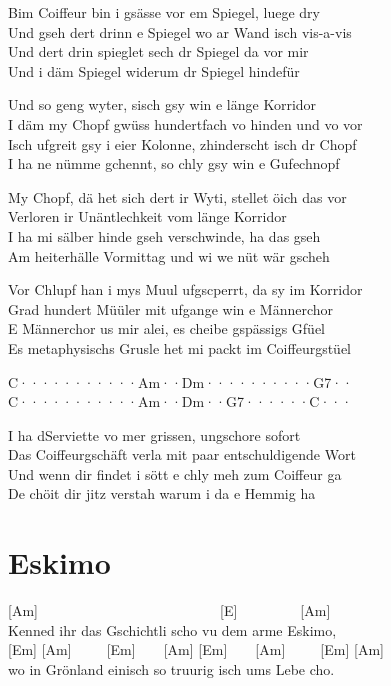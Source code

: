 \documentclass[
  letterpaper,
  twoside=false]{scrbook}
\begin{document}
Bim Coiffeur bin i gsässe vor em Spiegel, luege dry\\
Und gseh dert drinn e Spiegel wo ar Wand isch vis-a-vis\\
Und dert drin spieglet sech dr Spiegel da vor mir\\
Und i däm Spiegel widerum dr Spiegel hindefür

Und so geng wyter, s\textquotesingle isch gsy win e länge Korridor\\
I däm my Chopf gwüss hundertfach vo hinden und vo vor\\
Isch ufgreit gsy i eier Kolonne, z\textquotesingle hinderscht isch dr
Chopf\\
I ha ne nümme gchennt, so chly gsy win e Gufechnopf

My Chopf, dä het sich dert ir Wyti, stellet öich das vor\\
Verloren ir Unäntlechkeit vom länge Korridor\\
I ha mi sälber hinde gseh verschwinde, ha das gseh\\
Am heiterhälle Vormittag und wi we nüt wär gscheh

Vor Chlupf han i mys Muul ufgscperrt, da sy im Korridor\\
Grad hundert Müüler mit ufgange win e Männerchor\\
E Männerchor us mir alei, es cheibe gspässigs Gfüel\\
Es metaphysischs Grusle het mi packt im Coiffeurgstüel

\textbar C·······\textbar····Am··\textbar Dm······\textbar····G7··\textbar{}\\
\textbar C·······\textbar····Am··\textbar Dm··G7··\textbar····C···\textbar{}

I ha d\textquotesingle Serviette vo mer grissen, ungschore sofort\\
Das Coiffeurgschäft verla mit paar entschuldigende Wort\\
Und wenn dir findet i sött e chly meh zum Coiffeur ga\\
De chöit dir jitz verstah warum i da e Hemmig ha

\hypertarget{eskimo}{%
\chapter{Eskimo}\label{eskimo}}

{[}Am{]}~~~~~~~~~~~~~~~~~~~~~~~~~~{[}E{]}~~~~~~~~~{[}Am{]}\\
Kenned ihr das Gschichtli scho vu dem arme Eskimo,\\
{[}Em{]} {[}Am{]}~~~~~{[}Em{]}~~~~{[}Am{]}
{[}Em{]}~~~~{[}Am{]}~~~~~{[}Em{]} {[}Am{]}\\
wo in Grönland einisch so truurig isch ums Lebe cho.
\end{document}
